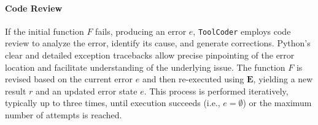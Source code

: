 \paragraph{Code Review}
If the initial function $F$ fails, producing an error $e$, \texttt{ToolCoder} employs  code review to analyze the error, identify its cause, and generate corrections. Python's clear and detailed exception tracebacks allow precise pinpointing of the error location and facilitate understanding of the underlying issue. The function $F$ is revised based on the current error $e$ and then re-executed using $\mathbf{E}$, yielding a new result $r$ and an updated error state $e$. This process is performed iteratively, typically up to three times, until execution succeeds (i.e., $e = \emptyset$) or the maximum number of attempts is reached.